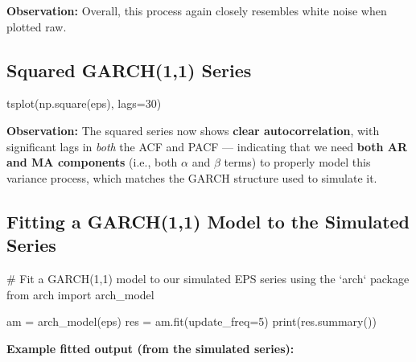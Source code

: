 \documentclass[12pt,openany]{book}
\theoremstyle{definition}
\theoremstyle{remark}
\begin{document}
\textbf{Observation:} Overall, this process again closely resembles white noise when plotted raw.

\subsection{Squared GARCH(1,1) Series}

\begin{python}
tsplot(np.square(eps), lags=30)
\end{python}

\textbf{Observation:} The squared series now shows \textbf{clear autocorrelation}, with significant lags in \emph{both} the ACF and PACF — indicating that we need \textbf{both AR and MA components} (i.e., both \ensuremath{\alpha} and \ensuremath{\beta} terms) to properly model this variance process, which matches the GARCH structure used to simulate it.

\subsection{Fitting a GARCH(1,1) Model to the Simulated Series}

\begin{python}
# Fit a GARCH(1,1) model to our simulated EPS series using the `arch` package
from arch import arch_model

am = arch_model(eps)
res = am.fit(update_freq=5)
print(res.summary())
\end{python}

\textbf{Example fitted output (from the simulated series):}
\end{document}
